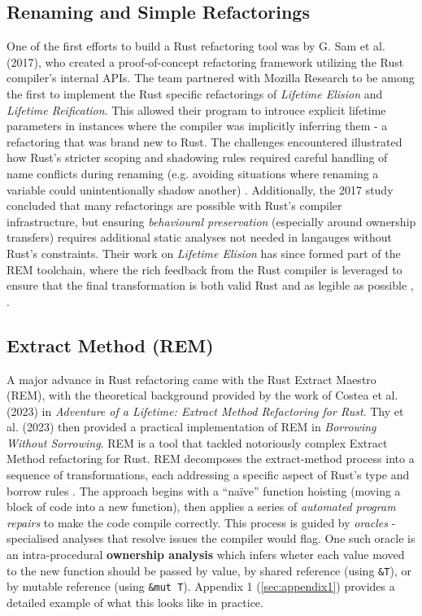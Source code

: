 \subsection{Renaming and Simple Refactorings}
One of the first efforts to build a Rust refactoring tool was by G. Sam et al.
(2017), who created a proof-of-concept refactoring framework utilizing the Rust
compiler's internal APIs. The team partnered with Mozilla Research to be among
the first to implement the Rust specific refactorings of \textit{Lifetime
Elision} and \textit{Lifetime Reification}. This allowed their program to
introuce explicit lifetime parameters in instances where the compiler was
implicitly inferring them - a refactoring that was brand new to Rust. The
challenges encountered illustrated how Rust's stricter scoping and shadowing
rules required careful handling of name conflicts during renaming (e.g. avoiding
situations where renaming a variable could unintentionally shadow another)
\cite{automated_refactoring_of_rust_programs}. Additionally, the 2017 study
concluded that many refactorings are possible with Rust's compiler
infrastructure, but ensuring \textit{behavioural preservation} (especially
around ownership transfers) requires additional static analyses not needed in
langauges without Rust's constraints. Their work on \textit{Lifetime Elision}
has since formed part of the REM toolchain, where the rich feedback from the
Rust compiler is leveraged to ensure that the final transformation is both
valid Rust and as legible as possible \cite{AdventureOfALifetime},
\cite{BorrowingWithoutSorrowing}.

\subsection{Extract Method (REM)}

A major advance in Rust refactoring came with the Rust Extract Maestro (REM),
with the theoretical background provided by the work of Costea et al. (2023) in
\textit{Adventure of a Lifetime: Extract Method Refactoring for Rust}. Thy et
al. (2023) then provided a practical implementation of REM in \textit{Borrowing
Without Sorrowing}. REM is a tool that tackled notoriously complex Extract
Method refactoring for Rust. REM decomposes the extract-method process into a
sequence of transformations, each addressing a specific aspect of Rust's type
and borrow rules \cite{AdventureOfALifetime}. The approach begins with a
``na\"ive'' function hoisting (moving a block of code into a new function), then
applies a series of \textit{automated program repairs} to make the code compile
correctly. This process is guided by \textit{oracles} - specialised analyses
that resolve issues the compiler would flag. One such oracle is an
intra-procedural \textbf{ownership analysis} which infers wheter each value
moved to the new function should be passed by value, by shared reference (using
\texttt{\&T}), or by mutable reference (using \texttt{\&mut T}). Appendix 1
(\ref{sec:appendix1}) provides a detailed example of what this looks like in
practice.

